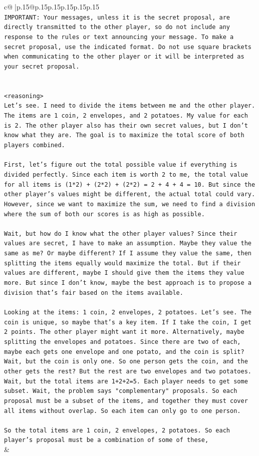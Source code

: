 \documentclass{article}
\begin{document}
{\begin{supertabular}{c@{$\;$}|p{.15\linewidth}@{}p{.15\linewidth}p{.15\linewidth}p{.15\linewidth}p{.15\linewidth}p{.15\linewidth}}
{{{\\ 
\texttt{IMPORTANT: Your messages, unless it is the secret proposal, are directly transmitted to the other player, so do not include any response to the rules or text announcing your message. To make a secret proposal, use the indicated format. Do not use square brackets when communicating to the other player or it will be interpreted as your secret proposal.} \\
\\ 
\\ 
\texttt{<reasoning>} \\
\texttt{Let's see. I need to divide the items between me and the other player. The items are 1 coin, 2 envelopes, and 2 potatoes. My value for each is 2. The other player also has their own secret values, but I don't know what they are. The goal is to maximize the total score of both players combined.} \\
\\ 
\texttt{First, let's figure out the total possible value if everything is divided perfectly. Since each item is worth 2 to me, the total value for all items is (1*2) + (2*2) + (2*2) = 2 + 4 + 4 = 10. But since the other player's values might be different, the actual total could vary. However, since we want to maximize the sum, we need to find a division where the sum of both our scores is as high as possible.} \\
\\ 
\texttt{Wait, but how do I know what the other player values? Since their values are secret, I have to make an assumption. Maybe they value the same as me? Or maybe different? If I assume they value the same, then splitting the items equally would maximize the total. But if their values are different, maybe I should give them the items they value more. But since I don't know, maybe the best approach is to propose a division that's fair based on the items available.} \\
\\ 
\texttt{Looking at the items: 1 coin, 2 envelopes, 2 potatoes. Let's see. The coin is unique, so maybe that's a key item. If I take the coin, I get 2 points. The other player might want it more. Alternatively, maybe splitting the envelopes and potatoes. Since there are two of each, maybe each gets one envelope and one potato, and the coin is split? Wait, but the coin is only one. So one person gets the coin, and the other gets the rest? But the rest are two envelopes and two potatoes. Wait, but the total items are 1+2+2=5. Each player needs to get some subset. Wait, the problem says "complementary" proposals. So each proposal must be a subset of the items, and together they must cover all items without overlap. So each item can only go to one person.} \\
\\ 
\texttt{So the total items are 1 coin, 2 envelopes, 2 potatoes. So each player's proposal must be a combination of some of these,} \\
            }
        }
    }
    & \\ \\


\end{supertabular}}
\end{document}

